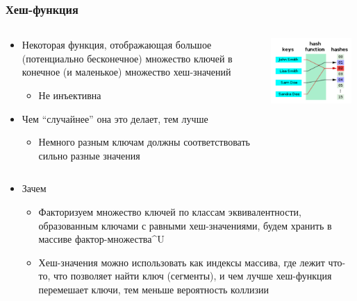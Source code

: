\documentclass[xetex,mathserif,serif]{beamer}
\begin{document}
	\begin{frame}
		\frametitle{Хеш-функция}
		\begin{columns}
			\begin{column}{0.75\textwidth}
				\begin{itemize}
					\item Некоторая функция, отображающая большое (потенциально бесконечное) множество ключей в конечное (и маленькое) множество хеш-значений
					\begin{itemize}
						\item Не инъективна
					\end{itemize}
					\item Чем ``случайнее'' она это делает, тем лучше
					\begin{itemize}
						\item Немного разным ключам должны соответствовать сильно разные значения
					\end{itemize}
				\end{itemize}
			\end{column}
			\begin{column}{0.25\textwidth}
				\begin{center}
					\includegraphics[width=0.95\textwidth]{hashfunction.png}
				\end{center}
			\end{column}
		\end{columns}
		\begin{itemize}
			\item Зачем
			\begin{itemize}
				\item Факторизуем множество ключей по классам эквивалентности, образованным ключами с равными хеш-значениями, будем хранить в массиве фактор-множества\^{}U
				\item Хеш-значения можно использовать как индексы массива, где лежит что-то, что позволяет найти ключ (сегменты), и чем лучше хеш-функция перемешает ключи, тем меньше вероятность коллизии
			\end{itemize}
		\end{itemize}
	\end{frame}
\end{document}

